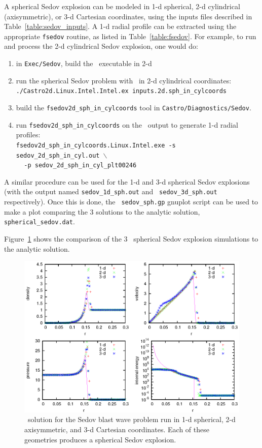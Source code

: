 A spherical Sedov explosion can be modeled in 1-d spherical, 2-d
cylindrical (axisymmetric), or 3-d Cartesian coordinates, using the
inputs files described in Table~\ref{table:sedov_inputs}.  A 1-d radial
profile can be extracted using the appropriate {\tt fsedov} routine,
as listed in Table~\ref{table:fsedov}.  For example, to run and process
the 2-d cylindrical Sedov explosion, one would do:
\begin{enumerate}
\item in {\tt Exec/Sedov}, build the \castro\ executable in 2-d
\item run the spherical Sedov problem with \castro\ in 2-d cylindrical coordinates: \\
 {\tt ./Castro2d.Linux.Intel.Intel.ex inputs.2d.sph\_in\_cylcoords} 
\item build the {\tt fsedov2d\_sph\_in\_cylcoords} tool in 
{\tt Castro/Diagnostics/Sedov}.  
\item run {\tt fsedov2d\_sph\_in\_cylcoords} on the \castro\ output to generate 1-d radial
 profiles: \\
 {\tt fsedov2d\_sph\_in\_cylcoords.Linux.Intel.exe -s sedov\_2d\_sph\_in\_cyl.out $\mathtt{\backslash}$ } \\
 $~~~~~${\tt -p sedov\_2d\_sph\_in\_cyl\_plt00246} 
\end{enumerate}
A similar procedure can be used for the 1-d and 3-d spherical Sedov
explosions (with the output named {\tt sedov\_1d\_sph.out} and {\tt
  sedov\_3d\_sph.out} respectively).  Once this is done, the {\tt
  sedov\_sph.gp} gnuplot script can be used to make a plot comparing
the 3 solutions to the analytic solution, {\tt spherical\_sedov.dat}.

Figure~\ref{fig:sedov_sph} shows the comparison of the 3 \castro\
spherical Sedov explosion simulations to the analytic solution.

\begin{figure}[t]
\centering
\includegraphics[width=5.0in]{sedov_sph}
\caption{\label{fig:sedov_sph} \castro\ solution for the Sedov blast wave problem
  run in 1-d spherical, 2-d axisymmetric, and 3-d Cartesian coordinates.
  Each of these geometries produces a spherical Sedov explosion.}
\end{figure}


